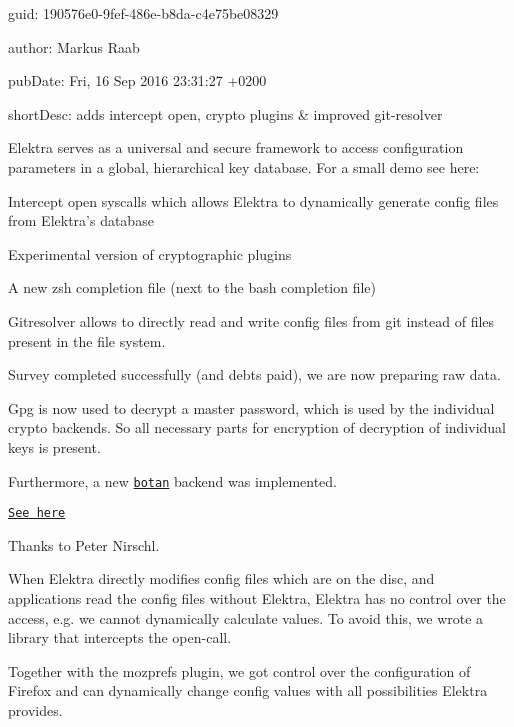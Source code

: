 
\begin{DoxyItemize}
\item guid\+: 190576e0-\/9fef-\/486e-\/b8da-\/c4e75be08329
\item author\+: Markus Raab
\item pub\+Date\+: Fri, 16 Sep 2016 23\+:31\+:27 +0200
\item short\+Desc\+: adds intercept open, crypto plugins \& improved git-\/resolver
\end{DoxyItemize}

Elektra serves as a universal and secure framework to access configuration parameters in a global, hierarchical key database. For a small demo see here\+:

\href{https://asciinema.org/a/cantr04assr4jkv8v34uz9b8r}{\tt }


\begin{DoxyItemize}
\item Intercept open syscalls which allows Elektra to dynamically generate config files from Elektra’s database
\item Experimental version of cryptographic plugins
\item A new zsh completion file (next to the bash completion file)
\item Gitresolver allows to directly read and write config files from git instead of files present in the file system.
\item Survey completed successfully (and debts paid), we are now preparing raw data.
\end{DoxyItemize}

Gpg is now used to decrypt a master password, which is used by the individual crypto backends. So all necessary parts for encryption of decryption of individual keys is present.

Furthermore, a new \href{https://botan.randombit.net}{\tt botan} backend was implemented.

\href{https://master.libelektra.org/src/plugins/crypto}{\tt See here}

Thanks to Peter Nirschl.

When Elektra directly modifies config files which are on the disc, and applications read the config files without Elektra, Elektra has no control over the access, e.\+g. we cannot dynamically calculate values. To avoid this, we wrote a library that intercepts the {\ttfamily open}-\/call.

Together with the {\ttfamily mozprefs} plugin, we got control over the configuration of Firefox and can dynamically change config values with all possibilities Elektra provides.

